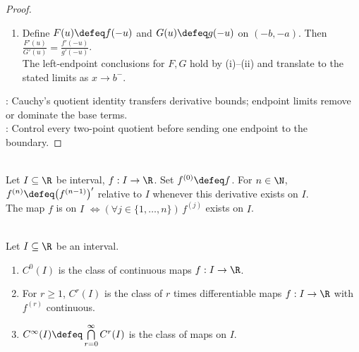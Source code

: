 \begin{theorem}
\begin{proof}
\begin{enumerate}[label=(\roman*)]
Each tightened bound remains inside prescribed neighborhood after these perturbations. Thus $\frac{f(r)}{g(r)}\to A$ by Definition \ref{def:extended-real-function-limits}.
\item Define $F(u)\defeq f(-u)$ and $G(u)\defeq g(-u)$ on $(-b,-a)$. Then $\frac{F'(u)}{G'(u)}=\frac{f'(-u)}{g'(-u)}$.\\
The left-endpoint conclusions for $F,G$ hold by (i)--(ii) and translate to the stated limits as $x\to b^-$.
\end{enumerate}
: Cauchy's quotient identity transfers derivative bounds; endpoint limits remove or dominate the base terms.\\
: Control every two-point quotient before sending one endpoint to the boundary.
\end{proof}
\end{theorem}

\begin{definition} \label{def:higher-derivatives} \\
Let $I\subseteq\R$ be interval, $f:I\to\R$. Set $f^{(0)}\defeq f$. For $n\in\N$, $f^{(n)}\defeq\bigl(f^{(n-1)}\bigr)'$ relative to $I$ whenever this derivative exists on $I$.\\
The map $f$ is  on $I$ $\Longleftrightarrow(\forall j\in\{1,\ldots,n\})\,f^{(j)}$ exists on $I$.
\end{definition}

\begin{definition} \label{def:smoothness-classes-one-variable} \\
Let $I\subseteq\R$ be an interval.
\begin{enumerate}[label=(\roman*)]
\setlength{\itemsep}{0pt}
\item $C^0(I)$ is the class of continuous maps $f:I\to\R$.
\item For $r\geq1$, $C^r(I)$ is the class of $r$ times differentiable maps $f:I\to\R$ with $f^{(r)}$ continuous.
\item $C^\infty(I)\defeq\bigcap\limits_{r=0}^{\infty}C^r(I)$ is the class of  maps on $I$.
\end{enumerate}
\end{definition}


